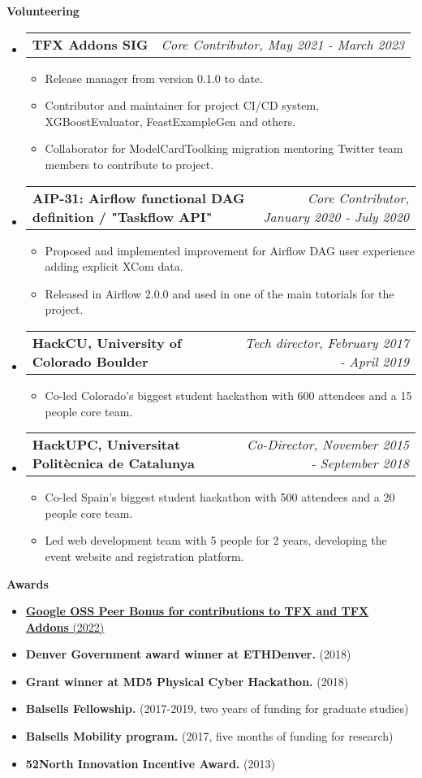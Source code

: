 \documentclass[letterpaper,10pt]{article}
\makeatletter
\newcommand{\resitem}[1]{\item #1 \vspace{-2pt}}
\newcommand{\resheading}[1]{{\large \colorbox{mygrey}{\begin{minipage}{\textwidth}{\textbf{#1 \vphantom{p\^{E}}}}\end{minipage}}}}
\newcommand{\ressubheading}[4]{
\begin{tabular*}{7.0in}{l@{\extracolsep{\fill}}r}
		\textbf{#1} & \textit{#4} \\
\end{tabular*}\vspace{-6pt}}
\makeatother
\begin{document}
\resheading{Volunteering}
	\begin{itemize}
\item 
		\ressubheading{TFX Addons SIG}{Boulder, CO}{Core Contributor}{Core Contributor, May 2021 - March 2023}
			\begin{itemize}
				\resitem{Release manager from version 0.1.0 to date.}
				\resitem{Contributor and maintainer for project CI/CD system, XGBoostEvaluator, FeastExampleGen and others.}
				\resitem{Collaborator for ModelCardToolking migration mentoring Twitter team members to contribute to project.} 
			\end{itemize}
		\item
			\ressubheading{
AIP-31: Airflow functional DAG definition / "Taskflow API"}{Boulder, CO, USA}{ML Engineer}{Core Contributor, January 2020 - July 2020}
			\begin{itemize}
				\resitem{Proposed and implemented improvement for Airflow DAG user experience adding explicit XCom data.}
				\resitem{Released in Airflow 2.0.0 and used in one of the main tutorials for the project.}
				
			\end{itemize}
		\item 
			\ressubheading{HackCU, University of Colorado Boulder}{Boulder, CO}{Tech director}{Tech director, February 2017 - April 2019}
			\begin{itemize}
				\resitem{Co-led Colorado's biggest student hackathon with 600 attendees and a 15 people core team.}
			\end{itemize}
		\item
			\ressubheading{HackUPC, Universitat Polit\`ecnica de Catalunya}{Barcelona, Spain}{Co-Director and organizer}{Co-Director, November 2015 - September 2018}
			\begin{itemize}
				\resitem{Co-led Spain's biggest student hackathon with 500 attendees and a 20 people core team.}
				\resitem{Led web development team with 5 people for 2 years, developing the event website and registration platform.}
			\end{itemize}

			
	\end{itemize}


\resheading{Awards}
	\begin{itemize}
		\resitem{\href{https://opensource.googleblog.com/2022/03/Announcing-First-Group-of-Google-Open-Source-Peer-Bonus-Winners-in-2022.html}{\textbf{Google OSS Peer Bonus for contributions to TFX and TFX Addons} (2022)}}
		\resitem{\textbf{Denver Government award winner at ETHDenver.} (2018)}
		\resitem{\textbf{Grant winner at MD5 Physical Cyber Hackathon.} (2018)}
		\resitem{\textbf{Balsells Fellowship.} (2017-2019, two years of funding for graduate studies)}
		\resitem{\textbf{Balsells Mobility program.} (2017, five months of funding for research)}
		\resitem{\textbf{52North Innovation Incentive Award.} (2013)}
	\end{itemize}
\end{document}
